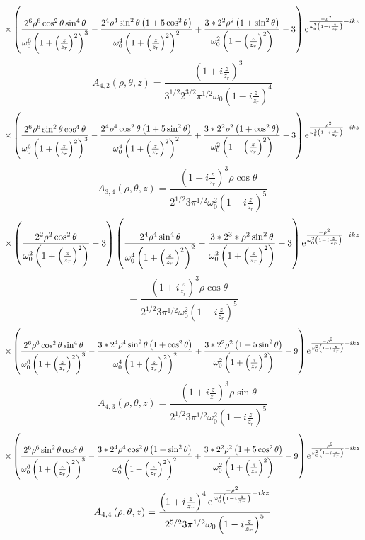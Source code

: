 \documentclass[11pt]{amsart}
\makeatletter
\newcommand{\e}{{\rm e}}				%
\newcommand{\0}{\varnothing}		%
\newcommand{\1}{!}
\newcommand{\2}{@}
\newcommand{\3}{\#}
\newcommand{\4}{\$}
\newcommand{\5}{\%}
\newcommand{\6}{$^\wedge$}
\newcommand{\7}{\&}
\newcommand{\8}{*}
\newcommand{\9}{(}
\makeatother
\begin{document}
\[
\times\left(\frac{2^6\rho^6\cos^2\theta\sin^4\theta}{\omega_0^6\left(1+\left(\frac{z}{z_r}\right)^2\right)^3} - \frac{2^4\rho^4\sin^2\theta\left(1+5\cos^2\theta\right)}{\omega_0^4\left(1+\left(\frac{z}{z_r}\right)^2\right)^2}+\frac{3*2^2\rho^2\left(1+\sin^2\theta\right)}{\omega_0^2\left(1+\left(\frac{z}{z_r}\right)^2\right)}-3\right)\e^{\frac{-\rho^2}{\omega_0^2\left(1-i\frac{z}{z_r}\right)}-ikz}
\]
\[
A_{4,2}\left(\rho,\theta,z\right)=\frac{\left(1+i\frac{z}{z_r}\right)^3}{3^{1/2}2^{3/2}\pi^{1/2}\omega_0\left(1-i\frac{z}{z_r}\right)^4}
\]
\[
\times\left(\frac{2^6\rho^6\sin^2\theta\cos^4\theta}{\omega_0^6\left(1+\left(\frac{z}{z_r}\right)^2\right)^3} - \frac{2^4\rho^4\cos^2\theta\left(1+5\sin^2\theta\right)}{\omega_0^4\left(1+\left(\frac{z}{z_r}\right)^2\right)^2}+\frac{3*2^2\rho^2\left(1+\cos^2\theta\right)}{\omega_0^2\left(1+\left(\frac{z}{z_r}\right)^2\right)}-3\right)\e^{\frac{-\rho^2}{\omega_0^2\left(1-i\frac{z}{z_r}\right)}-ikz}
\]
\[
A_{3,4}\left(\rho,\theta,z\right)=\frac{\left(1+i\frac{z}{z_r}\right)^3\rho\cos\theta}{2^{1/2}3\pi^{1/2}\omega_0^2\left(1-i\frac{z}{z_r}\right)^5}
\]
\[
\times\left(\frac{2^2\rho^2\cos^2\theta}{\omega_0^2\left(1+\left(\frac{z}{z_r}\right)^2\right)}-3\right)\left(\frac{2^4\rho^4\sin^4\theta}{\omega_0^4\left(1+\left(\frac{z}{z_r}\right)^2\right)^2}-\frac{3*2^3*\rho^2\sin^2\theta}{\omega_0^2\left(1+\left(\frac{z}{z_r}\right)^2\right)}+3\right)\e^{\frac{-\rho^2}{\omega_0^2\left(1-i\frac{z}{z_r}\right)}-ikz}
\]
\[
=\frac{\left(1+i\frac{z}{z_r}\right)^3\rho\cos\theta}{2^{1/2}3\pi^{1/2}\omega_0^2\left(1-i\frac{z}{z_r}\right)^5}
\]
\[
\times\left(\frac{2^6\rho^6\cos^2\theta\sin^4\theta}{\omega_0^6\left(1+\left(\frac{z}{z_r}\right)^2\right)^3}-\frac{3*2^4\rho^4\sin^2\theta\left(1+\cos^2\theta\right)}{\omega_0^4\left(1+\left(\frac{z}{z_r}\right)^2\right)^2}+\frac{3*2^2\rho^2\left(1+5\sin^2\theta\right)}{\omega_0^2\left(1+\left(\frac{z}{z_r}\right)^2\right)}-9\right)\e^{\frac{-\rho^2}{\omega_0^2\left(1-i\frac{z}{z_r}\right)}-ikz}
\]
\[
A_{4,3} \left(\rho,\theta,z\right)= \frac{\left(1+i\frac{z}{z_r}\right)^3\rho\sin\theta}{2^{1/2}3\pi^{1/2}\omega_0^2\left(1-i\frac{z}{z_r}\right)^5}
\]
\[
\times\left(\frac{2^6\rho^6\sin^2\theta\cos^4\theta}{\omega_0^6\left(1+\left(\frac{z}{z_r}\right)^2\right)^3}-\frac{3*2^4\rho^4\cos^2\theta\left(1+\sin^2\theta\right)}{\omega_0^4\left(1+\left(\frac{z}{z_r}\right)^2\right)^2}+\frac{3*2^2\rho^2\left(1+5\cos^2\theta\right)}{\omega_0^2\left(1+\left(\frac{z}{z_r}\right)^2\right)}-9\right)\e^{\frac{-\rho^2}{\omega_0^2\left(1-i\frac{z}{z_r}\right)}-ikz}
\]
\[
A_{4,4} \left(\rho,\theta,z\right)  = \frac{\left(1+i\frac{z}{z_r}\right)^4\e^{\frac{-\rho^2}{\omega_0^2\left(1-i\frac{z}{z_r}\right)}-ikz}}{2^{5/2}3\pi^{1/2}\omega_0\left(1-i\frac{z}{z_r}\right)^5}
\]
\end{document}
